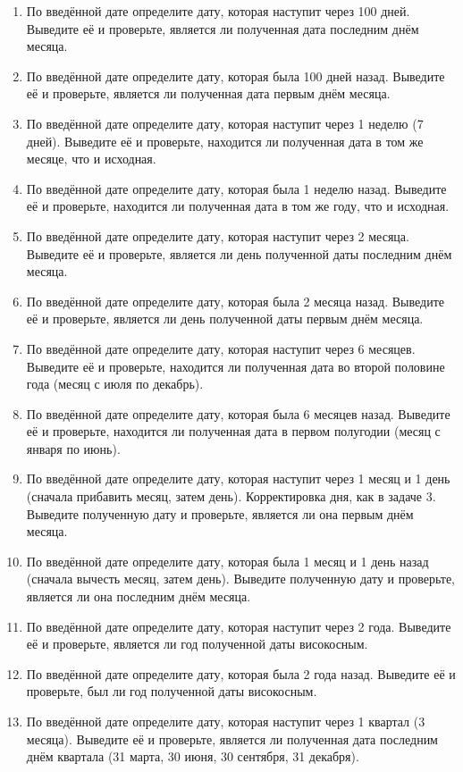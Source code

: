 \documentclass[12pt]{article}
\begin{document}
\begin{enumerate}
    \item По введённой дате определите дату, которая наступит через 100 дней. Выведите её и проверьте, является ли полученная дата последним днём месяца.
    \item По введённой дате определите дату, которая была 100 дней назад. Выведите её и проверьте, является ли полученная дата первым днём месяца.
    \item По введённой дате определите дату, которая наступит через 1 неделю (7 дней). Выведите её и проверьте, находится ли полученная дата в том же месяце, что и исходная.
    \item По введённой дате определите дату, которая была 1 неделю назад. Выведите её и проверьте, находится ли полученная дата в том же году, что и исходная.
    \item По введённой дате определите дату, которая наступит через 2 месяца. Выведите её и проверьте, является ли день полученной даты последним днём месяца.
    \item По введённой дате определите дату, которая была 2 месяца назад. Выведите её и проверьте, является ли день полученной даты первым днём месяца.
    \item По введённой дате определите дату, которая наступит через 6 месяцев. Выведите её и проверьте, находится ли полученная дата во второй половине года (месяц с июля по декабрь).
    \item По введённой дате определите дату, которая была 6 месяцев назад. Выведите её и проверьте, находится ли полученная дата в первом полугодии (месяц с января по июнь).
    \item По введённой дате определите дату, которая наступит через 1 месяц и 1 день (сначала прибавить месяц, затем день). Корректировка дня, как в задаче 3. Выведите полученную дату и проверьте, является ли она первым днём месяца.
    \item По введённой дате определите дату, которая была 1 месяц и 1 день назад (сначала вычесть месяц, затем день). Выведите полученную дату и проверьте, является ли она последним днём месяца.
    \item По введённой дате определите дату, которая наступит через 2 года. Выведите её и проверьте, является ли год полученной даты високосным.
    \item По введённой дате определите дату, которая была 2 года назад. Выведите её и проверьте, был ли год полученной даты високосным.
    \item По введённой дате определите дату, которая наступит через 1 квартал (3 месяца). Выведите её и проверьте, является ли полученная дата последним днём квартала (31 марта, 30 июня, 30 сентября, 31 декабря).

\end{enumerate}
\end{document}
